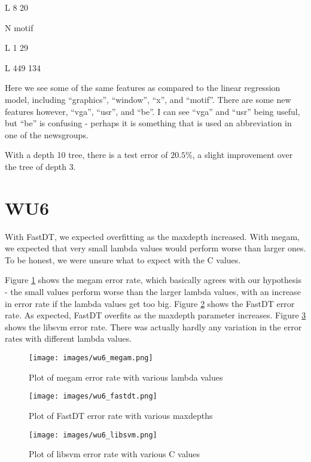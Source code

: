 L 8 20

N motif

L 1 29

L 449 134

Here we see some of the same features as compared to the linear regression model, including ``graphics'', ``window'', ``x'', and ``motif''. There are some new features however, ``vga'', ``usr'', and ``be''. I can see ``vga'' and ``usr'' being useful, but ``be'' is confusing - perhaps it is something that is used an abbreviation in one of the newsgroups.

With a depth 10 tree, there is a test error of $20.5\%$, a slight improvement over the tree of depth 3.

\section{WU6}
    With FastDT, we expected overfitting as the maxdepth increased. With megam, we expected that very small lambda values would perform worse than larger ones. To be honest, we were unsure what to expect with the C values. 

    Figure \ref{fig:megam} shows the megam error rate, which basically agrees with our hypothesis - the small values perform worse than the larger lambda values, with an increase in error rate if the lambda values get too big. Figure \ref{fig:fastdt} shows the FastDT error rate. As expected, FastDT overfits as the maxdepth parameter increases. Figure \ref{fig:libsvm} shows the libsvm error rate. There was actually hardly any variation in the error rates with different lambda values.

    \begin{figure}
	    \caption{Plot of megam error rate with various lambda values}
	    \label{fig:megam}
	    \texttt{[image: images/wu6\_megam.png]}
    \end{figure}

    \begin{figure}
	    \caption{Plot of FastDT error rate with various maxdepths}
	    \label{fig:fastdt}
	    \texttt{[image: images/wu6\_fastdt.png]}
    \end{figure}

    \begin{figure}
	    \caption{Plot of libsvm error rate with various C values}
	    \label{fig:libsvm}
	    \texttt{[image: images/wu6\_libsvm.png]}
    \end{figure}


